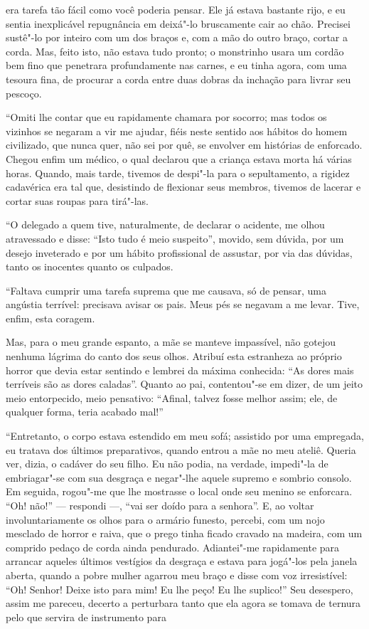 \quebra

\noindent{}era tarefa tão fácil como você poderia
pensar. Ele já estava bastante rijo, e eu sentia inexplicável repugnância
em deixá"-lo bruscamente cair ao chão. Precisei
sustê"-lo por inteiro com um dos braços e, com a mão do outro braço,
cortar a corda. Mas, feito isto, não estava tudo pronto; o monstrinho
usara um cordão bem fino que penetrara profundamente nas
carnes, e eu tinha agora, com uma tesoura fina, de procurar a corda 
entre duas dobras da inchação para livrar seu pescoço.

“Omiti lhe contar que eu rapidamente chamara por
socorro; mas todos os vizinhos se negaram a vir me ajudar,
fiéis neste sentido aos hábitos do homem civilizado, que nunca quer,
não sei por quê, se envolver em histórias de enforcado. Chegou enfim um
médico, o qual declarou que a criança estava morta há várias horas.
Quando, mais tarde, tivemos de despi"-la para o sepultamento, a
rigidez cadavérica era tal que, desistindo de flexionar seus membros,
tivemos de lacerar e cortar suas roupas para tirá"-las.

“O delegado a quem tive, naturalmente, de declarar o
acidente, me olhou atravessado e disse: ``Isto tudo é meio
suspeito'', movido, sem dúvida, por um desejo inveterado e
por um hábito profissional de assustar, por via das dúvidas, tanto os
inocentes quanto os culpados.

“Faltava cumprir uma tarefa suprema que me causava, só
de pensar, uma angústia terrível: precisava avisar os pais. Meus pés
se negavam a me levar. Tive, enfim, esta coragem.

\quebra

\noindent{}Mas, para o meu grande
espanto, a mãe se manteve impassível, não gotejou nenhuma lágrima do canto
dos seus olhos. Atribuí esta estranheza ao próprio horror que devia estar
sentindo e lembrei da máxima conhecida: ``As dores mais
terríveis são as dores caladas''. Quanto ao pai,
contentou"-se em dizer, de um jeito meio entorpecido, meio pensativo:
“Afinal, talvez fosse melhor assim; ele, de qualquer
forma, teria acabado mal!''

“Entretanto, o corpo estava estendido em meu sofá; assistido 
por uma empregada, eu tratava dos últimos preparativos, quando
entrou a mãe no meu ateliê. Queria ver, dizia, o cadáver do seu
filho. Eu não podia, na verdade, impedi"-la de embriagar"-se com sua
desgraça e negar"-lhe aquele supremo e sombrio consolo. Em seguida,
rogou"-me que lhe mostrasse o local onde seu menino se
enforcara. “Oh! não!'' --- respondi ---, “vai ser doído
para a senhora''. E, ao voltar involuntariamente os olhos
para o armário funesto, percebi, com um nojo mesclado de horror e
raiva, que o prego tinha ficado cravado na madeira, com um comprido
pedaço de corda ainda pendurado. Adiantei"-me rapidamente para arrancar
aqueles últimos vestígios da desgraça e estava para jogá"-los 
pela janela aberta, quando a pobre mulher agarrou meu braço e disse com voz
irresistível: “Oh! Senhor! Deixe isto para mim! Eu lhe peço! Eu
lhe suplico!” Seu desespero, assim me pareceu, decerto a
perturbara tanto que ela agora se tomava de ternura pelo que 
servira de instrumento para

